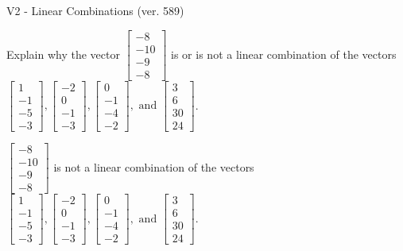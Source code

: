 \begin{exercise}
  \begin{exerciseTitle}V2 - Linear Combinations (ver. 589)\end{exerciseTitle}
  \begin{exerciseStatement}
    Explain why the vector \(\left[\begin{array}{c}
-8 \\
-10 \\
-9 \\
-8
\end{array}\right]\)  is or is not a linear 
	combination of the vectors \(\left[\begin{array}{c}
1 \\
-1 \\
-5 \\
-3
\end{array}\right] , \left[\begin{array}{c}
-2 \\
0 \\
-1 \\
-3
\end{array}\right] , \left[\begin{array}{c}
0 \\
-1 \\
-4 \\
-2
\end{array}\right] , \text{ and } \left[\begin{array}{c}
3 \\
6 \\
30 \\
24
\end{array}\right]\).
	


  \end{exerciseStatement}
  \begin{exerciseAnswer}
   \(\left[\begin{array}{c}
-8 \\
-10 \\
-9 \\
-8
\end{array}\right]\) 
  	 is not  
	a linear combination of the vectors \(\left[\begin{array}{c}
1 \\
-1 \\
-5 \\
-3
\end{array}\right] , \left[\begin{array}{c}
-2 \\
0 \\
-1 \\
-3
\end{array}\right] , \left[\begin{array}{c}
0 \\
-1 \\
-4 \\
-2
\end{array}\right] , \text{ and } \left[\begin{array}{c}
3 \\
6 \\
30 \\
24
\end{array}\right]\).


\end{exerciseAnswer}
\end{exercise}
